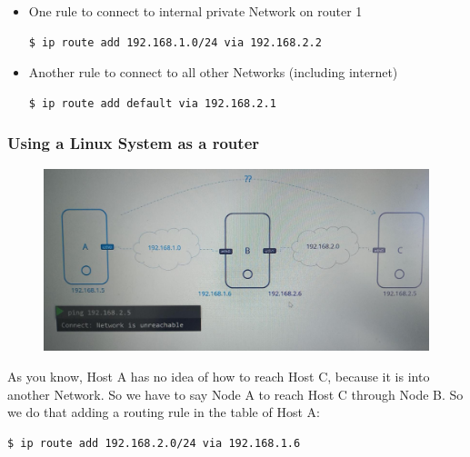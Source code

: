 \documentclass{article}
\newenvironment{codetemplate}[1][]{%
  \mybasecolorbox[#1]
  \itshape
}{%
  \endmybasecolorbox
}
\begin{document}
\begin{itemize}
    \item One rule to connect to internal private Network on router 1
\begin{codetemplate}{}
\begin{verbatim}
$ ip route add 192.168.1.0/24 via 192.168.2.2
\end{verbatim}
\end{codetemplate}

    \item Another rule to connect to all other Networks (including internet)
\begin{codetemplate}{}
\begin{verbatim}
$ ip route add default via 192.168.2.1
\end{verbatim}
\end{codetemplate}
\end{itemize}

\subsubsection{Using a Linux System as a router}

\begin{figure}[H]
    \includegraphics[width=\textwidth]{pictures/ntw6.png}
\end{figure}

As you know, Host A has no idea of how to reach Host C, because it is into another Network. So we have to say Node A to reach Host C through Node B. So we do that adding a routing rule in the table of Host A:

\begin{codetemplate}{}
\begin{verbatim}
$ ip route add 192.168.2.0/24 via 192.168.1.6
\end{verbatim}
\end{codetemplate}
\end{document}
